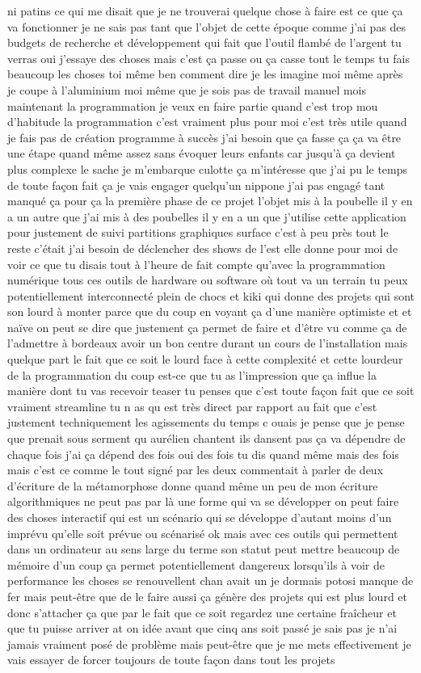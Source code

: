 ni patins ce qui me disait que je ne trouverai quelque chose à faire est ce que ça va fonctionner je ne sais pas tant que l'objet de cette époque comme j'ai pas des budgets de recherche et développement qui fait que l'outil flambé de l'argent tu verras oui j'essaye des choses mais c'est ça passe ou ça casse tout le temps tu fais beaucoup les choses toi même ben comment dire je les imagine moi même après je coupe à l'aluminium moi même que je sois pas de travail manuel mois maintenant la programmation je veux en faire partie quand c'est trop mou d'habitude la programmation c'est vraiment plus pour moi c'est très utile quand je fais pas de création programme à succès j'ai besoin que ça fasse ça ça va être une étape quand même assez sans évoquer leurs enfants car jusqu'à ça devient plus complexe le sache je m'embarque culotte ça m'intéresse que j'ai pu le temps de toute façon fait ça je vais engager quelqu'un nippone j'ai pas engagé tant manqué ça pour ça la première phase de ce projet l'objet mis à la poubelle il y en a un autre que j'ai mis à des poubelles il y en a un que j'utilise cette application pour justement de suivi partitions graphiques surface c'est à peu près tout le reste c'était j'ai besoin de déclencher des shows de l'est elle donne pour moi de voir ce que tu disais tout à l'heure de fait compte qu'avec la programmation numérique tous ces outils de hardware ou software où tout va un terrain tu peux potentiellement interconnecté plein de chocs et kiki qui donne des projets qui sont son lourd à monter parce que du coup en voyant ça d'une manière optimiste et et naïve on peut se dire que justement ça permet de faire et d'être vu comme ça de l'admettre à bordeaux avoir un bon centre durant un cours de l'installation mais quelque part le fait que ce soit le lourd face à cette complexité et cette lourdeur de la programmation du coup est-ce que tu as l'impression que ça influe la manière dont tu vas recevoir teaser tu penses que c'est toute façon fait que ce soit vraiment streamline tu n as qu est très direct par rapport au fait que c'est justement techniquement les agissements du temps c ouais je pense que je pense que prenait sous serment qu aurélien chantent ils dansent pas ça va dépendre de chaque fois j'ai ça dépend des fois oui des fois tu dis quand même mais des fois mais c'est ce comme le tout signé par les deux commentait à parler de deux d'écriture de la métamorphose donne quand même un peu de mon écriture algorithmiques ne peut pas par là une forme qui va se développer on peut faire des choses interactif qui est un scénario qui se développe d'autant moins d'un imprévu qu'elle soit prévue ou scénarisé ok mais avec ces outils qui permettent dans un ordinateur au sens large du terme son statut peut mettre beaucoup de mémoire d'un coup ça permet potentiellement dangereux lorsqu'ils à voir de performance les choses se renouvellent chan avait un je dormais potosi manque de fer mais peut-être que de le faire aussi ça génère des projets qui est plus lourd et donc s'attacher ça que par le fait que ce soit regardez une certaine fraîcheur et que tu puisse arriver at on idée avant que cinq ans soit passé je sais pas je n'ai jamais vraiment posé de problème mais peut-être que je me mets effectivement je vais essayer de forcer toujours de toute façon dans tout les projets 